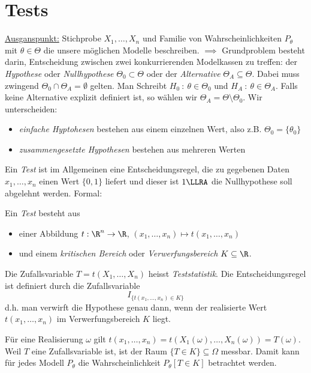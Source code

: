 \section{Tests}
\underline{Ausganspunkt:} Stichprobe $X_1, \dots, X_n$ und Familie von Wahrscheinlichkeiten $P_\theta$ mit $\theta \in \Theta$ die unsere möglichen Modelle beschreiben. $\implies$ Grundproblem besteht darin, Entscheidung zwischen zwei konkurrierenden Modelkassen zu treffen: der \textit{Hypothese} oder \textit{Nullhypothese} $\Theta_0 \subset \Theta$ oder der \textit{Alternative} $\Theta_A \subseteq \Theta$. Dabei muss zwingend $\Theta_0 \cap \Theta_A = \emptyset$ gelten. Man Schreibt $H_0 \ : \ \theta \in \Theta_0$ und $H_A \ : \ \theta \in \Theta_A$. Falls keine Alternative explizit definiert ist, so wählen wir $\Theta_A = \Theta \setminus \Theta_0$. Wir unterscheiden:
\begin{itemize}
\item \textit{einfache Hyptohesen} bestehen aus einem einzelnen Wert, also z.B. $\Theta_0 = \{\theta_0\}$
\item \textit{zusammengesetzte Hypothesen} bestehen aus mehreren Werten 
\end{itemize}
Ein \textit{Test} ist im Allgemeinen eine Entscheidungsregel, die zu gegebenen Daten $x_1,\dots,x_n$ einen Wert $\{0,1\}$ liefert und dieser ist $1 \LLRA$ die Nullhypothese soll abgelehnt werden. Formal:
\begin{definition}
Ein \textit{Test} besteht aus 
\begin{itemize}
\item einer Abbildung $t: \R^n \to \R$, $(x_1,\dots,x_n) \mapsto t(x_1,\dots,x_n)$
\item und einem \textit{kritischen Bereich} oder \textit{Verwerfungsbereich} $K \subseteq \R$.
\end{itemize}
Die Zufallsvariable $T = t(X_1,\dots,X_n)$ heisst \textit{Teststatistik}.
Die Entscheidungsregel ist definiert durch die Zufallsvariable
$$ I_{\{t(x_1,\dots,x_n) \in K\}}$$ d.h. man verwirft die Hypothese genau dann, wenn der realisierte Wert $t(x_1,\dots,x_n)$ im Verwerfungsbereich $K$ liegt.
\end{definition} 

Für eine Realisierung $\omega$ gilt $t(x_1,\dots,x_n) = t(X_1(\omega), \dots, X_n(\omega)) = T(\omega)$. Weil $T$ eine Zufallsvariable ist, ist der Raum $\{T \in K\} \subseteq \Omega$ messbar. Damit kann für jedes Modell $P_\theta$ die Wahrscheinlichkeit $P_\theta[T\in K]$ betrachtet werden.

